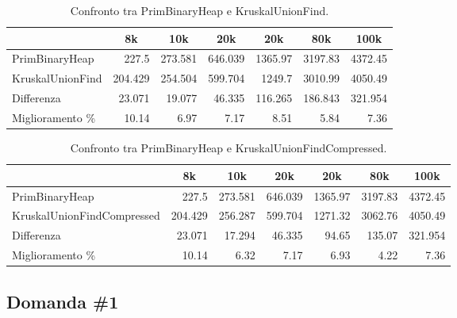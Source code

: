 \begin{table}[H]
\centering
    \begin{tabular}{|l|rrrrrr|}
    \hline
    &  \multicolumn{1}{c}{8k} & \multicolumn{1}{c}{10k} & \multicolumn{1}{c}{20k} & \multicolumn{1}{c}{20k} & \multicolumn{1}{c}{80k} &           \multicolumn{1}{c|}{100k} \\
    \hline
     PrimBinaryHeap   & 227.5   & 273.581 & 646.039 & 1365.97  & 3197.83  & 4372.45  \\
     KruskalUnionFind & 204.429 & 254.504 & 599.704 & 1249.7   & 3010.99  & 4050.49 \\ \hline
     Differenza       &  23.071 &  19.077 &  46.335 &  116.265 &  186.843 &  321.954 \\
     Miglioramento \%    &  10.14  &   6.97  &   7.17  &    8.51  &    5.84  &    7.36  \\
    \hline
    \end{tabular}
    \caption{Confronto tra PrimBinaryHeap e KruskalUnionFind.}
    \label{table:prim-binary-heap-vs-kruskal-union-find}
\end{table}

\begin{table}[H]
\centering
    \begin{tabular}{|l|rrrrrr|}
    \hline
    &  \multicolumn{1}{c}{8k} & \multicolumn{1}{c}{10k} & \multicolumn{1}{c}{20k} & \multicolumn{1}{c}{20k} & \multicolumn{1}{c}{80k} &           \multicolumn{1}{c|}{100k} \\
    \hline
 PrimBinaryHeap             & 227.5   & 273.581 & 646.039 & 1365.97 & 3197.83 & 4372.45  \\
 KruskalUnionFindCompressed & 204.429 & 256.287 & 599.704 & 1271.32 & 3062.76 & 4050.49 \\ \hline
     Differenza                 &  23.071 &  17.294 &  46.335 &   94.65 &  135.07 &  321.954 \\
     Miglioramento \%              &  10.14  &   6.32  &   7.17  &    6.93 &    4.22 &    7.36  \\
    \hline
    \end{tabular}
    \caption{Confronto tra PrimBinaryHeap e KruskalUnionFindCompressed.}
    \label{table:prim-binary-heap-vs-kruskal-union-find-compressed}
\end{table}

\subsection{Domanda \#1}

